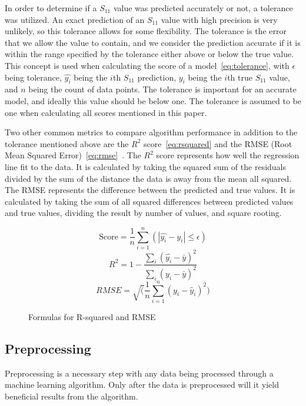 \documentclass[lettersize,journal]{IEEEtran}
\begin{document}
In order to determine if a $S_{11}$ value was predicted accurately or not, a tolerance was utilized. An exact prediction of an $S_{11}$ value with high precision is very unlikely, so this tolerance allows for some flexibility. The tolerance is the error that we allow the value to contain, and we consider the prediction accurate if it is within the range specified by the tolerance either above or below the true value. This concept is used when calculating the score of a model~\eqref{eq:tolerance}, with $\epsilon$ being tolerance, $\hat{y_i}$ being the $i$th $S_{11}$ prediction, $y_i$ being the $i$th true $S_{11}$ value, and $n$ being the count of data points. The tolerance is important for an accurate model, and ideally this value should be below one. The tolerance is assumed to be one when calculating all scores mentioned in this paper.

Two other common metrics to compare algorithm performance in addition to the tolerance mentioned above are the $R^2$ score~\eqref{eq:rsquared} and the RMSE (Root Mean Squared Error)~\eqref{eq:rmse}~\cite{haque_machine_2023,m_el-kenawy_optimized_2022}. The $R^2$ score represents how well the regression line fit to the data. It is calculated by taking the squared sum of the residuals divided by the sum of the distance the data is away from the mean all squared. The RMSE represents the difference between the predicted and true values. It is calculated by taking the sum of all squared differences between predicted values and true values, dividing the result by number of values, and square rooting.

\begin{figure}[h]
    \begin{equation}
        \text{Score} = \frac{1}{n} \sum_{i=1}^{n}(\left|\hat{y_i} - y_i\right| \leq \epsilon)
        \label{eq:tolerance}
    \end{equation}
    \begin{equation}
        R^2 = 1 - \frac{\sum_{i}(\hat{y_i} - \bar{y})^2}{\sum_{i}(y_i - \bar{y})^2}
        \label{eq:rsquared}
    \end{equation}
    \begin{equation}
        {RMSE} = \sqrt(\frac{1}{n} \sum_{i=1}^{n}(y_i - \hat{y}_i)^2)
        \label{eq:rmse}
    \end{equation}
    \caption{Formulas for R-squared and RMSE}
\end{figure}


\subsection{Preprocessing}
Preprocessing is a necessary step with any data being processed through a machine learning algorithm. Only after the data is preprocessed will it yield beneficial results from the algorithm.
\end{document}
